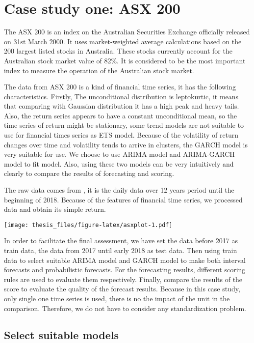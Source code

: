 \documentclass{monashthesis}
\theoremstyle{definition}
\theoremstyle{definition}
\theoremstyle{definition}
\theoremstyle{remark}
\begin{document}
\chapter{Case study one: ASX 200}\label{case-study-one-asx-200}

The ASX 200 is an index on the Australian Securities Exchange officially
released on 31st March 2000. It uses market-weighted average
calculations based on the 200 largest listed stocks in Australia. These
stocks currently account for the Australian stock market value of 82\%.
It is considered to be the most important index to measure the operation
of the Australian stock market.

The data from ASX 200 is a kind of financial time series, it has the
following characteristics. Firstly, The unconditional distribution is
leptokurtic, it means that comparing with Gaussian distribution it has a
high peak and heavy tails. Also, the return series appears to have a
constant unconditional mean, so the time series of return might be
stationary, some trend models are not suitable to use for financial
times series as ETS model. Because of the volatility of return changes
over time and volatility tends to arrive in clusters, the GARCH model is
very suitable for use. We choose to use ARIMA model and ARIMA-GARCH
model to fit model. Also, using these two models can be very intuitively
and clearly to compare the results of forecasting and scoring.

The raw data comes from \textcite{YH}, it is the daily data over 12
years period until the beginning of 2018. Because of the features of
financial time series, we processed data and obtain its simple return.

\texttt{[image: thesis\_files/figure-latex/asxplot-1.pdf]}

In order to facilitate the final assessment, we have set the data before
2017 as train data, the data from 2017 until early 2018 as test data.
Then using train data to select suitable ARIMA model and GARCH model to
make both interval forecasts and probabilistic forecasts. For the
forecasting results, different scoring rules are used to evaluate them
respectively. Finally, compare the results of the score to evaluate the
quality of the forecast results. Because in this case study, only single
one time series is used, there is no the impact of the unit in the
comparison. Therefore, we do not have to consider any standardization
problem.

\section{Select suitable models}\label{select-suitable-models}
\end{document}
